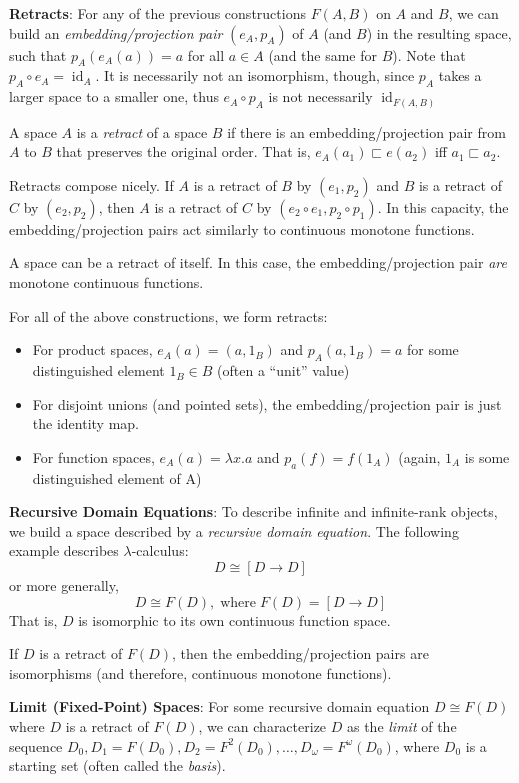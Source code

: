 \documentclass{article}
\begin{document}
\textbf{Retracts}: For any of the previous constructions $F(A, B)$ on
$A$ and $B$, we can build an \emph{embedding/projection pair} $(e_A,
p_A)$ of $A$ (and $B$) in the resulting space, such that $p_A(e_A(a))
= a$ for all $a\in A$ (and the same for $B$).  Note that $p_A \circ
e_A = \operatorname{id}_A$.  It is necessarily not an isomorphism,
though, since $p_A$ takes a larger space to a smaller one, thus $e_A
\circ p_A$ is not necessarily $\operatorname{id}_{F(A,B)}$

A space $A$ is a \emph{retract} of a space $B$ if there is an
embedding/projection pair from $A$ to $B$ that preserves the original
order.  That is, $e_A(a_1) \sqsubset e(a_2)$ iff $a_1 \sqsubset a_2$.

Retracts compose nicely.  If $A$ is a retract of $B$ by $(e_1, p_2)$
and $B$ is a retract of $C$ by $(e_2, p_2)$, then $A$ is a retract of
$C$ by $(e_2\circ e_1, p_2\circ p_1)$.  In this capacity, the
embedding/projection pairs act similarly to continuous monotone
functions.

A space can be a retract of itself.  In this case, the
embedding/projection pair \emph{are} monotone continuous functions.

For all of the above constructions, we form retracts:
\begin{itemize}
  \item For product spaces, $e_A(a) = (a, 1_B)$ and $p_A(a, 1_B) = a$
    for some distinguished element $1_B\in B$ (often a ``unit'' value)
  \item For disjoint unions (and pointed sets), the
    embedding/projection pair is just the identity map.
  \item For function spaces, $e_A(a) = \lambda x. a$ and $p_a(f) =
    f(1_A)$ (again, $1_A$ is some distinguished element of A)
\end{itemize}

\textbf{Recursive Domain Equations}: To describe infinite and
infinite-rank objects, we build a space described by a \emph{recursive
  domain equation}.  The following example describes
$\lambda$-calculus:
\[D \cong [D \rightarrow D]\]
or more generally,
\[D \cong F(D), \operatorname{where} F(D) = [D\rightarrow D]\]
That is, $D$ is isomorphic to its own continuous function space.

If $D$ is a retract of $F(D)$, then the embedding/projection pairs are
isomorphisms (and therefore, continuous monotone functions).

\textbf{Limit (Fixed-Point) Spaces}: For some recursive domain equation
$D \cong F(D)$ where $D$ is a retract of $F(D)$, we can characterize
$D$ as the \emph{limit} of the sequence $D_0, D_1 = F(D_0), D_2 =
F^2(D_0), \ldots, D_{\omega} = F^{\omega}(D_0)$, where $D_0$ is a
starting set (often called the \emph{basis}).
\end{document}
